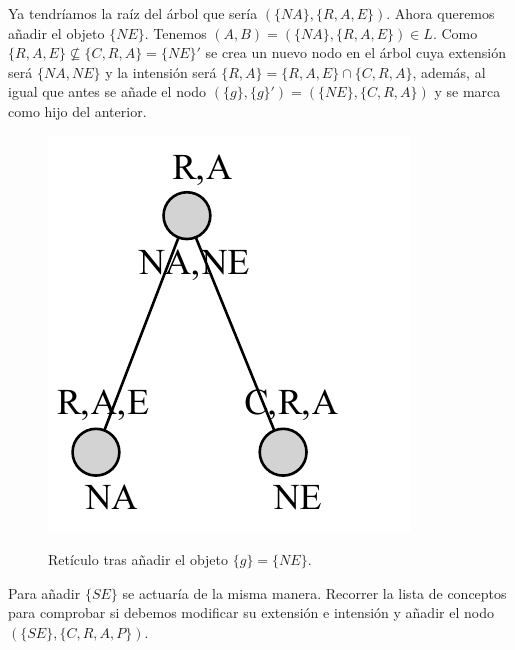 \documentclass[oneside,openright,titlepage,numbers=noenddot,openany,headinclude,footinclude=true,
cleardoublepage=empty,abstractoff,BCOR=5mm,paper=a4,fontsize=12pt,main=spanish]{scrreprt}
\begin{document}
Ya tendríamos la raíz del árbol que sería $(\{NA\},\{R,A,E\})$. Ahora queremos añadir el objeto $\{NE\}$. Tenemos $(A,B)=(\{NA\},\{R,A,E\}) \in L$. Como $\{R,A,E\} \nsubseteq \{C,R,A\}=\{NE\}'$ se crea un nuevo nodo en el árbol cuya extensión será $\{NA,NE\}$ y la intensión será $\{R,A\} =\{R,A,E\} \cap \{C,R,A\}$, además, al igual que antes se añade el nodo $(\{g\},\{g\}')=(\{NE\},\{C,R,A\})$ y se marca como hijo del anterior. 

\begin{figure}[H]
  \centering
  \includegraphics[scale=0.7]{images/paso2norris.pdf}
  \label{fig:test2}
\caption{Retículo tras añadir el objeto $\{g\}=\{NE\}$.}
\end{figure}

Para añadir $\{SE\}$ se actuaría de la misma manera. Recorrer la lista de conceptos para comprobar si debemos modificar su extensión e intensión y añadir el nodo $(\{SE\},\{C,R,A,P\})$.
\end{document}
